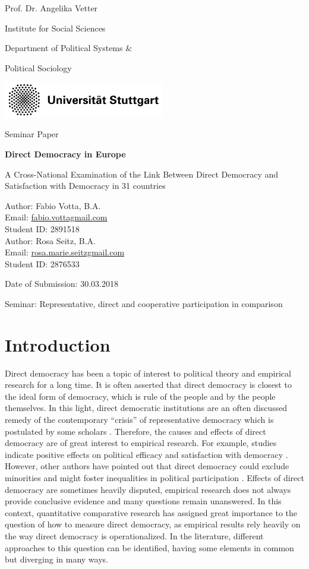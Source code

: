 \documentclass{systats}
\renewcommand{\maketitle}{
	\begin{titlepage}
		\begin{center}
			\setlength{\parskip}{0pt}
			
			\begin{multicols}{2}
				\flushleft
				{Prof. Dr. Angelika Vetter\par}
				{Institute for Social Sciences\par}
				{Department of Political Systems \&\par}
				{Political Sociology}
				\begin{flushright}
					\includegraphics[width=7cm]{images/logo_stuttgart.jpg}
				\end{flushright}
			\end{multicols}
			\vspace*{2mm}
			\center
			{\LARGE {Seminar Paper} \par}
			
			\vspace*{10mm}
			
			
			{\fontsize{26}{38} {\bfseries Direct Democracy in Europe} \par}
			\vspace*{1mm}
			{ \Large A Cross-National Examination of the Link Between Direct Democracy and Satisfaction with Democracy in 31 countries}
			\vspace*{10mm}
			
			\begin{multicols}{2}
				\center
				Author: Fabio Votta, B.A.\\
				Email: \href{mailto:fabio.vottagmail.com}{fabio.vottagmail.com}\\
				Student ID: 2891518\\
				
				Author: Rosa Seitz, B.A.\\
				Email: \href{mailto:rosa.marie.seitzgmail.com}{rosa.marie.seitzgmail.com}\\
				Student ID: 2876533\\
			\end{multicols}
			
			
			\vspace*{5mm}
			
			
			
			
			
			\vspace*{5mm}
			{Date of Submission: 30.03.2018 \par} %
			
		\end{center}
		\vspace*{2mm}
		\begin{abstract}
			\justifying
			\noindent This seminar paper seeks to investigate deliberation and its relationship to regime support across the world. This is accomplished by exploring the relevant literature and deriving hypotheses from it, which are subsequently tested by using survey data covering 113 countries and 306,047 individual respondents. Given that self-reported regime support is expected to be biased, a weight is applied to account for possible distortions of the data, though results are also reported for the unweighted variable due to the experimental nature of this weight. As this paper is the first known to the authors that examines the effect of deliberation on regime support in a cross-country design, the used deliberation measurement, 
		\end{abstract}
		\vspace*{2mm}
		\center		
		{\large {Seminar: Representative, direct and cooperative participation in comparison} \par}
		
	\end{titlepage}
}
\begin{document}
\maketitle

\clearpage


\newpage
\contents
\clearpage
\listoffigures
\clearpage
\listoftables

\clearpage
{}
\justify
\section{Introduction} 

Direct democracy has been a topic of interest to political theory and empirical research for a long time. It is often asserted that direct democracy is closest to the ideal form of democracy, which is rule of the people and by the people themselves. In this light, direct democratic institutions are an often discussed remedy of the contemporary “crisis” of representative democracy which is postulated by some scholars \citep[cf.][]{pogrebischi2015}. Therefore, the causes and effects of direct democracy are of great interest to empirical research. For example, studies indicate positive effects on political efficacy \citep[cf.][]{bernhardbuehlmann2014} and satisfaction with democracy \citep[cf.][]{stadelmannvatter2012}. However, other authors have pointed out that direct democracy could exclude minorities and might foster inequalities in political participation \citep[cf.][]{merkelritzi2017}. Effects of direct democracy are sometimes heavily disputed, empirical research does not always provide conclusive evidence and many questions remain unanswered. In this context, quantitative comparative research has assigned great importance to the question of how to measure direct democracy, as empirical results rely heavily on the way direct democracy is operationalized. In the literature, different approaches to this question can be identified, having some elements in common but diverging in many ways. 
\end{document}
